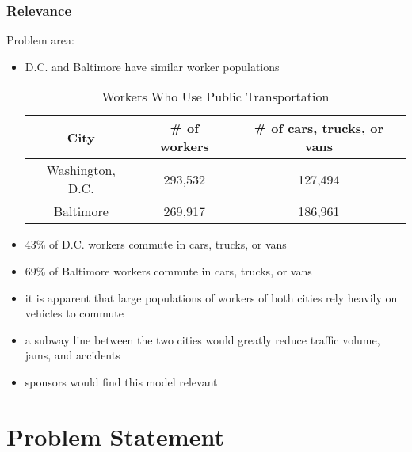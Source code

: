 \documentclass[compress,handout,10pt]{beamer}
\let\olditem\item
\renewcommand{\item}{\setlength{\itemsep}{0.5\baselineskip}\olditem}
\begin{document}
\begin{frame}
    \frametitle{Relevance}
    Problem area:
    \vspace{7pt}
     \begin{itemize}
	\item D.C. and Baltimore have similar worker populations
\begin{table}[ht]
\caption{Workers Who Use Public Transportation}   %
\centering %
\begin{tabular}{c c c} %
\hline\hline %
City & \# of workers & \# of cars, trucks, or vans \\ [0.5ex]
\hline  %
Washington, D.C. & 293,532 & 127,494 \\%
Baltimore & 269,917 & 186,961 \\ [1ex] %
\hline %
\end{tabular}
\label{table:workers} %
\end{table}
	\item 43\% of D.C. workers commute in cars, trucks, or vans
	\item 69\% of Baltimore workers commute in cars, trucks, or vans
	\item it is apparent that large populations of workers of both cities rely heavily on vehicles to commute
	\item a subway line between the two cities would greatly reduce traffic volume, jams, and accidents
	\item sponsors would find this model relevant
     \end{itemize}
\end{frame}

\section{Problem Statement}
\end{document}
